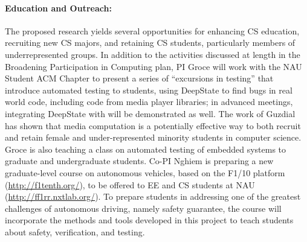 \paragraph{Education and Outreach:}
The proposed research yields several opportunities for enhancing CS
education, recruiting new CS majors, and retaining CS students,
particularly members of underrepresented groups.  In addition to the
activities discussed at length in the Broadening Participation in Computing plan,
PI Groce will work with the NAU Student ACM Chapter to present a
series of ``excursions in testing'' that introduce automated testing
to students, using DeepState to find bugs in real world code, including code from
media player libraries; in advanced meetings, integrating DeepState
with \framac will be demonstrated as well.  The work of Guzdial
\cite{Guzdial} has shown that media computation is a
potentially effective way to both recruit and retain female and
under-represented minority students in computer science. Groce is also teaching a
class on automated testing of embedded systems to graduate and
undergraduate students.
Co-PI Nghiem is preparing a new graduate-level course on autonomous
vehicles, based on the F1/10 platform (\url{http://f1tenth.org/}), to be offered to EE and CS students at NAU (\url{http://ff1rr.nxtlab.org/}).
To prepare students in addressing one of the greatest challenges of autonomous driving, namely safety guarantee, the course will incorporate the methods and tools developed in this project to teach students about safety, verification, and testing.

